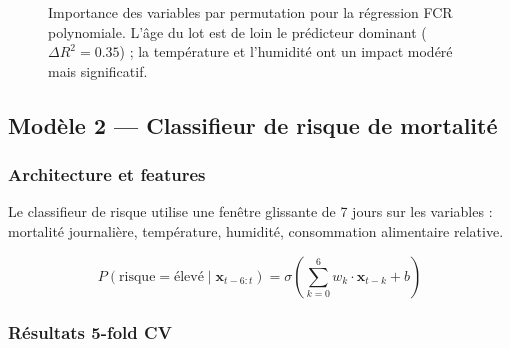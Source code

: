 \begin{figure}[H]
\centering
{}
\caption{Importance des variables par permutation pour la régression FCR polynomiale.
L'âge du lot est de loin le prédicteur dominant ($\Delta R^2 = 0.35$) ;
la température et l'humidité ont un impact modéré mais significatif.}
\label{fig:fcr_importance}
\end{figure}

\subsection{Modèle 2 — Classifieur de risque de mortalité}

\subsubsection{Architecture et features}

Le classifieur de risque utilise une fenêtre glissante de 7 jours sur les
variables : mortalité journalière, température, humidité, consommation
alimentaire relative.

\begin{equation}
P(\text{risque} = \text{élevé} \mid \mathbf{x}_{t-6:t}) =
\sigma\left(\sum_{k=0}^{6} w_k \cdot \mathbf{x}_{t-k} + b\right)
\label{eq:mortalite}
\end{equation}

\subsubsection{Résultats 5-fold CV}

